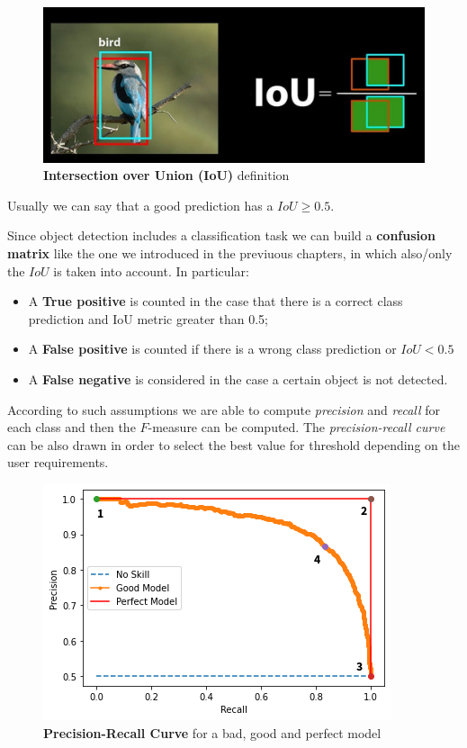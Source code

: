 \begin{figure}[h]
    \centering
    \includegraphics[scale=0.3]{img/IoU.png}
    \caption{\textbf{Intersection over Union (IoU)} definition}
\end{figure}

\noindent 
Usually we can say that a good prediction has a $
    IoU \ge 0.5
$. 

Since object detection includes a  classification task we can build a \textbf{confusion matrix} like the one we introduced in the previuous chapters, in which also/only the $IoU$ is taken into account. In particular:
\begin{itemize}
    \itemsep-0.3em
    \item A \textbf{True positive} is counted in the case that there is a correct class prediction and IoU metric greater than 0.5; 
    \item A \textbf{False positive} is counted if there is a wrong class prediction or $IoU<0.5$
    \item A \textbf{False negative} is considered in the case a certain object is not detected.
\end{itemize}
According to such assumptions we are able to compute \textit{precision} and \textit{recall} for each class and then the $F$-measure can be computed. The \textit{precision-recall curve} can be also drawn in order to select the best value for threshold depending on the user requirements.

\begin{figure}
    \centering
    \includegraphics[scale=0.8]{img/PR_curve.png}
    \caption{\textbf{Precision-Recall Curve} for a bad, good and perfect model}
\end{figure}

